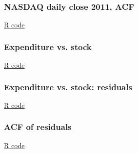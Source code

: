 \documentclass[handout]{beamer}
\begin{document}


   \begin{frame}
   \frametitle{NASDAQ daily close 2011, ACF}
   \begin{center}
   \end{center}
   \href{http://stats191.stanford.edu/correlated_errors.html#nasdaq}{R code}
   \end{frame}



   \begin{frame}
   \frametitle{Expenditure vs. stock}
   \begin{center}
   \end{center}
   \href{http://stats191.stanford.edu/correlated_errors.html#consumer-expenditure}{R code}
   \end{frame}



   \begin{frame}
   \frametitle{Expenditure vs. stock: residuals}
   \begin{center}
   \end{center}
   \href{http://stats191.stanford.edu/correlated_errors.html#consumer-expenditure}{R code}
   \end{frame}



   \begin{frame}
   \frametitle{ACF of residuals}
   \begin{center}
   \end{center}
   \href{http://stats191.stanford.edu/correlated_errors.html#consumer-expenditure}{R code}
   \end{frame}

\end{document}

